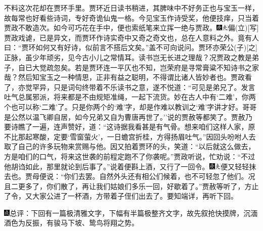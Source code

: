 不料这次花却在贾环手里。贾环近日读书稍进，其脾味中不好务正也与宝玉一样，故每常也好看些诗词，专好奇诡仙鬼一格。今见宝玉作诗受奖，他便技痒，只当着贾政不敢造次。如今可巧花在手中，便也索纸笔来立挥一绝与贾政。{\includegraphics[width=3mm]{../Images/00004}\includegraphics[width=3mm]{../Images/00012}\footnotesize \kaishu 偏{(立)}{[}写{]}贾政戏谑，已是异文，而贾环作诗实奇中又奇之奇文也，总在人意料之外。竟有人曰：``贾环如何又有好诗，似前言不搭后文矣。''盖不可向说问。贾环亦荣公{(子)}{[}之{]}正脉，虽少年顽劣，见今古小儿之常情耳。读书岂无长进之理哉？况贾政之教是弟子，自已大觉疏忽矣。若是贾环连一平仄也不知，岂荣府是寻常膏粱不知诗书之家哉？然后知宝玉之一种情思，正非有益之聪明，不得谓比诸人皆妙者也。}贾政看了，亦觉罕异，只是词句终带着不乐读书之意，遂不悦道：``可见是弟兄了。发言吐气总属邪派，将来都是不由规矩准绳，一起下流货。妙在古人中有`二难'，你两个也可以称`二难'了。只是你两个的`难'字，却是作难以教训之`难'字讲才好。哥哥是公然以温飞卿自居，如今兄弟又自为曹唐再世了。''说的贾赦等都笑了。贾赦乃要诗瞧了一遍，连声赞好，道：``这诗据我看甚是有气骨。想来咱们这样人家，原不比那起寒酸，定要`雪窗萤火'，一日蟾宫折桂，方得扬眉吐气。''因回头吩咐人去取了自己的许多玩物来赏赐与他。因又拍着贾环的头，笑道：``以后就这么做去，方是咱们的口气，将来这世袭的前程定跑不了你袭呢。''贾政听说，忙劝说：``不过他胡诌如此，那里就论到后事了。''说着便斟上酒，又行了一回令。{\includegraphics[width=3mm]{../Images/00004}\includegraphics[width=3mm]{../Images/00012}\footnotesize \kaishu 便又轻轻抹去也。}贾母便说：``你们去罢。自然外头还有相公们候着，也不可轻忽了他们。况且二更多了，你们散了，再让我们姑娘们多乐一回，好歇着了。''贾赦等听了，方止了令，又大家公进了一杯酒，方带着子侄们出去了。要知端详，再听下回。

{\includegraphics[width=3mm]{../Images/00005}\kaishu 总评：下回有一篇极清雅文字，下幅有半篇极整齐文字，故先叙抢快摸牌，沉湎酒色为反振，有骏马下坡、鸷鸟将翔之势。}

